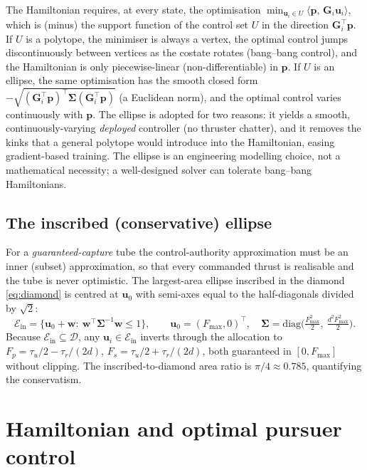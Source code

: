\documentclass[11pt]{article}
\newcommand{\Ein}{\mathcal{E}_{\mathrm{in}}}
\newcommand{\Gbf}{\bm{G}}
\newcommand{\ubf}{\bm{u}}
\newcommand{\pbf}{\bm{p}}
\newcommand{\inner}[2]{\langle #1,\, #2\rangle}
\begin{document}
The Hamiltonian requires, at every state, the optimisation
$\min_{\ubf_i\in U}\inner{\pbf}{\Gbf_i\ubf_i}$, which is (minus) the support function of the
control set $U$ in the direction $\Gbf_i^\top\pbf$. If $U$ is a polytope, the minimiser is always a
vertex, the optimal control jumps discontinuously between vertices as the costate rotates
(bang--bang control), and the Hamiltonian is only piecewise-linear (non-differentiable) in $\pbf$.
If $U$ is an ellipse, the same optimisation has the smooth closed form
$-\sqrt{(\Gbf_i^\top\pbf)^\top\bm{\Sigma}(\Gbf_i^\top\pbf)}$ (a Euclidean norm), and the optimal
control varies continuously with $\pbf$. The ellipse is adopted for two reasons: it yields a
smooth, continuously-varying \emph{deployed} controller (no thruster chatter), and it removes the
kinks that a general polytope would introduce into the Hamiltonian, easing gradient-based training.
The ellipse is an engineering modelling choice, not a mathematical necessity; a well-designed
solver can tolerate bang--bang Hamiltonians.

\subsection{The inscribed (conservative) ellipse}

For a \emph{guaranteed-capture} tube the control-authority approximation must be an inner
(subset) approximation, so that every commanded thrust is realisable and the tube is never
optimistic. The largest-area ellipse inscribed in the diamond \eqref{eq:diamond} is centred at
$\ubf_0$ with semi-axes equal to the half-diagonals divided by $\sqrt{2}$:
\begin{equation}\label{eq:Ein}
\Ein=\big\{\ubf_0+\bm{w}:\ \bm{w}^\top\bm{\Sigma}^{-1}\bm{w}\le 1\big\},\qquad
\ubf_0=(F_{\max},0)^\top,\quad
\bm{\Sigma}=\mathrm{diag}\!\Big(\tfrac{F_{\max}^2}{2},\ \tfrac{d^2F_{\max}^2}{2}\Big).
\end{equation}
Because $\Ein\subseteq\mathcal{D}$, any $\ubf_i\in\Ein$ inverts through the allocation to
$F_p=\tau_u/2-\tau_r/(2d)$, $F_s=\tau_u/2+\tau_r/(2d)$, both guaranteed in $[0,F_{\max}]$ without
clipping. The inscribed-to-diamond area ratio is $\pi/4\approx0.785$, quantifying the
conservatism.

\section{Hamiltonian and optimal pursuer control}
\end{document}
